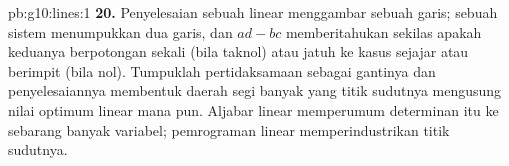 \begin{solution}{pb:g10:lines:1}
\textbf{20.} Penyelesaian sebuah  linear menggambar sebuah garis;
sebuah sistem menumpukkan dua garis, dan $ad - bc$ memberitahukan sekilas
apakah keduanya berpotongan sekali (bila taknol) atau jatuh ke kasus
sejajar atau berimpit (bila nol). Tumpuklah pertidaksamaan sebagai gantinya
dan penyelesaiannya membentuk daerah segi banyak yang titik sudutnya
mengusung nilai optimum linear mana pun. Aljabar linear memperumum
determinan itu ke sebarang banyak variabel; pemrograman linear
memperindustrikan titik sudutnya.

\end{solution}
